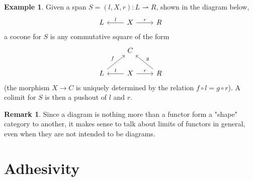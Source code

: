 \documentclass[a4paper, twoside,openright]{report}
\theoremstyle{plain}
\theoremstyle{definition}
\newtheorem{example}[theorem]{Example}
\newtheorem{remark}[theorem]{Remark}
\begin{document}
\begin{example}
    Given a span $S = (l, X, r): L \rightharpoonup R$, shown in the diagram below,
    \[
        \begin{tikzcd}
            L & X \arrow[l, "l"swap] \arrow[r, "r"]& R
        \end{tikzcd}
    \]
    a cocone for $S$ is any commutative square of the form
    \[
        \begin{tikzcd}
            & C & \\
            L \arrow[ur, "f"] &
            X \arrow[l, "l"swap] \arrow[r, "r"]&
            R \arrow[ul, "g" swap]
        \end{tikzcd}
    \]
    (the morphism $X \rightarrow C$ is uniquely determined by the relation $f \circ l = g \circ r$).
    A colimit for $S$ is then a pushout of $l$ and $r$.
\end{example}


\begin{remark}
    Since a diagram is nothing more than a functor form a "shape" category to another, it makes sense to talk about limits of functors in general, even when they are not intended to be diagrams.
\end{remark}

\section{Adhesivity}







\end{document}

